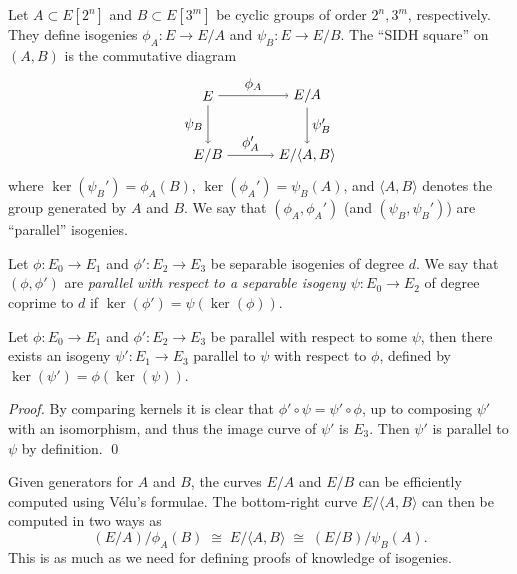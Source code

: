 Let $A \subset E[2^n]$ and $B \subset E[3^m]$ be cyclic groups of order $2^n, 3^m$, respectively.
They define isogenies $\phi_A : E \to E/A$ and $\psi_B : E \to E/B$.
The ``SIDH square'' on $(A,B)$ is the commutative diagram 
%
\begin{equation}
    \label{eq:sidh-square}
    \tikz[x=2.5cm,y=-1.5cm,baseline=-.75cm]{
    \node (E0) at (0,0) {$E$};
    \node (E1) at (1,0) {$E/A$};
    \node (E2) at (0,1) {$E/B$};
    \node (E3) at (1,1) {$E/\langle A, B\rangle$};
    \draw[->] (E0) edge node[above] {$\phi_A$} (E1)
    (E0) edge node[left] {$\psi_B$} (E2)
    (E1) edge node[right] {$\psi_B'$} (E3)
    (E2) edge node[above] {$\phi_A'$} (E3);
    }
\end{equation}
where $\ker(\psi_B')  = \phi_A(B)$,  $\ker( \phi_A' ) = \psi_B(A)$, and $\langle A, B\rangle$ denotes the group generated by $A$ and $B$.
%
We say that $(\phi_A,\phi_A')$ (and $(\psi_B,\psi_B')$) are ``parallel'' isogenies.

\begin{definition}
  Let $\phi : E_0 \to E_1$ and $\phi' : E_2 \to E_3$ be separable isogenies of degree $d$.
  We say that $(\phi,\phi')$ are \emph{parallel with respect to a separable isogeny $\psi : E_0 \to E_2$} of degree coprime to $d$ if $\ker(\phi') = \psi(\ker(\phi))$.
\end{definition}

\begin{lemma}
  Let $\phi : E_0 \to E_1$ and $\phi' : E_2 \to E_3$ be parallel with respect to some $\psi$, then there exists an isogeny $\psi' : E_1 \to E_3$ parallel to $\psi$ with respect to $\phi$, defined by $\ker(\psi') = \phi(\ker(\psi))$.
\end{lemma}
\begin{proof}
  By comparing kernels it is clear that $\phi' \circ \psi = \psi' \circ \phi$, up to composing $\psi'$ with an isomorphism, and thus the image curve of $\psi'$ is $E_3$.
  Then $\psi'$ is parallel to $\psi$ by definition. \qed
\end{proof}

Given generators for $A$ and $B$, the curves $E/A$ and $E/B$ can be efficiently computed using Vélu's formulae.
The bottom-right curve $E/\langle A,B\rangle$ can then be computed in two ways as
\begin{equation}
  \label{eq:sidh-push}
  (E/A)/\phi_A(B) \;\cong\; E/\langle A,B\rangle \;\cong\; (E/B)/\psi_B(A).
\end{equation}
This is as much as we need for defining proofs of knowledge of isogenies.




